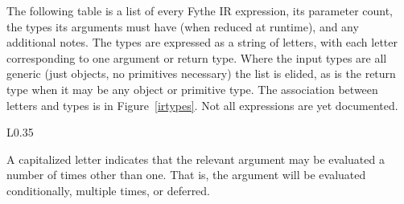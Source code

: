 The following table is a list of every Fythe IR expression, its parameter
count, the types its arguments must have (when reduced at runtime), and any
additional notes. The types are expressed as a string of letters, with each
letter corresponding to one argument or return type. Where the input types are
all generic (just objects, no primitives necessary) the list is elided, as is
the return type when it may be any object or primitive type. The association
between letters and types is in Figure~\ref{irtypes}. Not all expressions are
yet documented.


\begin{wrapfigure}{L}{0.35\textwidth}

A capitalized letter indicates that the relevant argument may be evaluated a
number of times other than one. That is, the argument will be evaluated
conditionally, multiple times, or deferred.

\caption{Fythe type identifiers}
\label{irtypes}
\end{wrapfigure}
